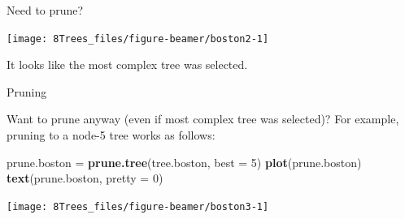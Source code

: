 \documentclass[10pt,ignorenonframetext,]{beamer}
\newenvironment{Shaded}{\begin{snugshade}}{\end{snugshade}}
\newcommand{\KeywordTok}[1]{\textcolor[rgb]{0.13,0.29,0.53}{\textbf{#1}}}
\newcommand{\DataTypeTok}[1]{\textcolor[rgb]{0.13,0.29,0.53}{#1}}
\newcommand{\DecValTok}[1]{\textcolor[rgb]{0.00,0.00,0.81}{#1}}
\newcommand{\StringTok}[1]{\textcolor[rgb]{0.31,0.60,0.02}{#1}}
\newcommand{\OperatorTok}[1]{\textcolor[rgb]{0.81,0.36,0.00}{\textbf{#1}}}
\newcommand{\NormalTok}[1]{#1}
\begin{document}
\begin{frame}[fragile]

\begin{block}{Need to prune?}

\scriptsize

\begin{Shaded}
\end{Shaded}

\begin{center}\texttt{[image: 8Trees\_files/figure-beamer/boston2-1]} \end{center}

\normalsize

It looks like the most complex tree was selected.

\end{block}

\end{frame}

\begin{frame}[fragile]

\begin{block}{Pruning}

\vspace{1mm}

Want to prune anyway (even if most complex tree was selected)? For
example, pruning to a node-5 tree works as follows:

\scriptsize

\begin{Shaded}
\begin{Highlighting}[]
\NormalTok{prune.boston =}\StringTok{ }\KeywordTok{prune.tree}\NormalTok{(tree.boston, }\DataTypeTok{best =} \DecValTok{5}\NormalTok{)}
\KeywordTok{plot}\NormalTok{(prune.boston)}
\KeywordTok{text}\NormalTok{(prune.boston, }\DataTypeTok{pretty =} \DecValTok{0}\NormalTok{)}
\end{Highlighting}
\end{Shaded}

\begin{center}\texttt{[image: 8Trees\_files/figure-beamer/boston3-1]} \end{center}

\end{block}

\end{frame}
\end{document}
